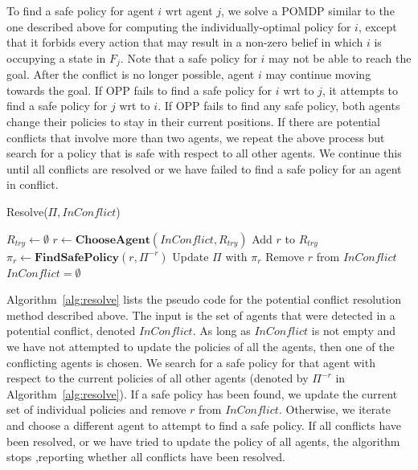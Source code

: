 \documentclass[letterpaper]{article} %
\newcommand{\inconflict}{\textit{InConflict}}
\newcommand{\roni}[1]{ }
\begin{document}
To find a safe policy for agent $i$ wrt agent $j$, we solve a POMDP similar to the one described above for computing the individually-optimal policy for $i$, except that it forbids every action that may result in a non-zero belief in which $i$ is occupying a state in $F_j$. Note that a safe policy for $i$ may not be able to reach the goal. After the conflict is no longer possible, agent $i$ may continue moving towards the goal.
If OPP fails to find a safe policy for $i$ wrt to $j$, it attempts to find a safe policy for $j$ wrt to $i$.
If OPP fails to find any safe policy, both agents change their policies to stay in their current positions.
If there are potential conflicts that involve more than two agents, we repeat the above process but search for a policy that is safe with respect to all other agents. We continue this until all conflicts are resolved or we have failed to find a safe policy for an agent in conflict.
\begin{algorithm}[t]
\caption{Resolve($\Pi, \inconflict$)}
\label{alg:resolve}
\scriptsize
\begin{algorithmic}[1]
\STATE $R_{try}\gets\emptyset$
\WHILE{$\inconflict$ is not empty and $\inconflict\setminus R_{try}\neq\emptyset$}
    \STATE $r \gets \textbf{ChooseAgent}(\inconflict, R_{try})$
    \STATE Add $r$ to $R_{try}$
    \STATE $\pi_r\gets \textbf{FindSafePolicy}(r, \Pi^{-r})$
        \STATE Update $\Pi$ with $\pi_r$
        \STATE Remove $r$ from $\inconflict$
    \ENDIF
\ENDWHILE
\RETURN $\inconflict=\emptyset$
\end{algorithmic}
\end{algorithm}
Algorithm~\ref{alg:resolve} lists the pseudo code for the potential conflict resolution method described above.
The input is the set of agents that were detected in a potential conflict, denoted $\inconflict$.
As long as $\inconflict$ is not empty and we have not attempted to update the policies of all the agents,
then one of the conflicting agents is chosen.
We search for a safe policy for that agent with respect to the current policies of all other agents (denoted by $\Pi^{-r}$ in Algorithm~\ref{alg:resolve}).
If a safe policy has been found, we update the current set of individual policies and remove $r$ from $\inconflict$.
Otherwise, we iterate and choose a different agent to attempt to find a safe policy.
If all conflicts have been resolved, or we have tried to update the policy of all agents, the algorithm stops ,reporting whether all conflicts have been resolved.
\roni{If space is an issue, consider removing the above paragraph and pseudo-code}
\end{document}
